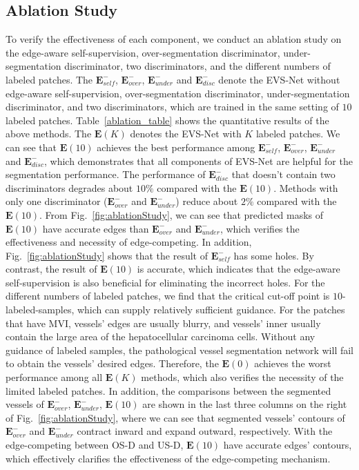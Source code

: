\documentclass[letterpaper]{article} %
\begin{document}
\subsection{Ablation Study}
To verify the effectiveness of each component,
 we conduct an ablation study on the edge-aware self-supervision, over-segmentation discriminator, under-segmentation discriminator, two discriminators, and the different numbers of labeled patches.
 The $\mathbf{E}_{self}^{-}$, $\mathbf{E}_{over}^{-}$, $\mathbf{E}_{under}^{-}$ and  $\mathbf{E}_{disc}^{-}$ denote the EVS-Net without edge-aware self-supervision, over-segmentation discriminator, under-segmentation discriminator, and two discriminators,
 which are trained in the same setting of $10$ labeled patches.
 Table~\ref{ablation_table} shows the quantitative results of the above methods.
  The $\mathbf{E}(K)$ denotes the EVS-Net with $K$ labeled patches.
 We can see that $\mathbf{E}(10)$ achieves the best performance among $\mathbf{E}_{self}^{-}$, $\mathbf{E}_{over}^{-}$, $\mathbf{E}_{under}^{-}$ and  $\mathbf{E}_{disc}^{-}$, which demonstrates that all components of EVS-Net are helpful for the segmentation performance.
 The performance of $\mathbf{E}_{disc}^{-}$ that doesn't contain two discriminators degrades about $10\%$ compared with the $\mathbf{E}(10)$.
 Methods with only one discriminator ($\mathbf{E}_{over}^{-}$ and $\mathbf{E}_{under}^{-}$) reduce about $2\%$ compared with the $\mathbf{E}(10)$. From Fig.~\ref{fig:ablationStudy}, we can see that predicted masks of  $\mathbf{E}(10)$ have accurate edges than $\mathbf{E}_{over}^{-}$ and $\mathbf{E}_{under}^{-}$, which verifies the effectiveness and necessity of edge-competing.
 In addition, Fig.~\ref{fig:ablationStudy} shows that the result of $\mathbf{E}_{self}^{-}$ has some holes.
 By contrast, the result of $\mathbf{E}(10)$ is accurate, which indicates that the edge-aware self-supervision is also beneficial for eliminating the incorrect holes.
For the different numbers of labeled patches, we find that the critical cut-off point is $10$-labeled-samples, which can supply relatively sufficient guidance. For the patches that have MVI, vessels' edges are usually blurry, and vessels' inner usually contain the large area of the hepatocellular carcinoma cells.
Without any guidance of labeled samples, the pathological vessel segmentation network will fail to obtain the vessels' desired edges.
Therefore, the $\mathbf{E}(0)$ achieves the worst performance among all $\mathbf{E}(K)$ methods, which also verifies the necessity of the limited labeled patches.
In addition, the comparisons between the segmented vessels of $\mathbf{E}_{over}^{-}$, $\mathbf{E}_{under}^{-}$, $\mathbf{E}(10)$ are shown in
 the last three columns on the right of Fig.~\ref{fig:ablationStudy},
 where we can see that segmented vessels'  contours of $\mathbf{E}_{over}^{-}$ and $\mathbf{E}_{under}^{-}$ contract inward and expand outward, respectively. With the edge-competing between OS-D and US-D, $\mathbf{E}(10)$ have accurate edges' contours, which effectively clarifies the effectiveness of the edge-competing mechanism.
\end{document}
